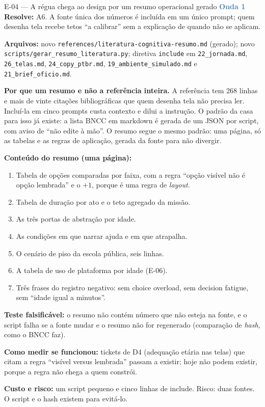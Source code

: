 \documentclass[11pt,a4paper]{article}
\newcommand{\onda}[1]{\textcolor{SteelBlue}{\textbf{Onda #1}}}
\begin{document}
\begin{emendabox}{E-04 --- A régua chega ao design por um resumo operacional gerado \hfill \onda{1}}
\textbf{Resolve:} A6. A fonte única dos números é incluída em um único prompt; quem desenha tela
recebe tetos ``a calibrar'' sem a explicação de quando não se aplicam.

\textbf{Arquivos:} novo \texttt{references/literatura-cognitiva-resumo.md} (gerado); novo
\texttt{scripts/gerar\_resumo\_literatura.py}; diretiva \texttt{include} em
\texttt{22\_jornada.md}, \texttt{26\_telas.md}, \texttt{24\_copy\_ptbr.md},
\texttt{19\_ambiente\_simulado.md} e \texttt{21\_brief\_oficio.md}.

\textbf{Por que um resumo e não a referência inteira.} A referência tem 268 linhas e mais de vinte
citações bibliográficas que quem desenha tela não precisa ler. Incluí-la em cinco prompts custa
contexto e dilui a instrução. O padrão da casa para isso já existe: a lista BNCC em markdown é
gerada de um JSON por script, com aviso de ``não edite à mão''. O resumo segue o mesmo padrão:
uma página, só as tabelas e as regras de aplicação, gerada da fonte para não divergir.

\textbf{Conteúdo do resumo (uma página):}
\begin{enumerate}
  \item Tabela de opções comparadas por faixa, com a regra ``opção visível não é opção lembrada''
        e o $+1$, porque é uma regra de \emph{layout}.
  \item Tabela de duração por ato e o teto agregado da missão.
  \item As três portas de abstração por idade.
  \item As condições em que narrar ajuda e em que atrapalha.
  \item O cenário de piso da escola pública, seis linhas.
  \item A tabela de uso de plataforma por idade (E-06).
  \item Três frases do registro negativo: sem choice overload, sem decision fatigue, sem ``idade
        igual a minutos''.
\end{enumerate}

\textbf{Teste falsificável:} o resumo não contém número que não esteja na fonte, e o script falha
se a fonte mudar e o resumo não for regenerado (comparação de \emph{hash}, como o BNCC faz).

\textbf{Como medir se funcionou:} tickets de D4 (adequação etária nas telas) que citam a regra
``visível versus lembrada'' passam a existir; hoje não podem existir, porque a regra não chega a
quem constrói.

\textbf{Custo e risco:} um script pequeno e cinco linhas de include. Risco: duas fontes. O
script e o hash existem para evitá-lo.
\end{emendabox}
\end{document}
